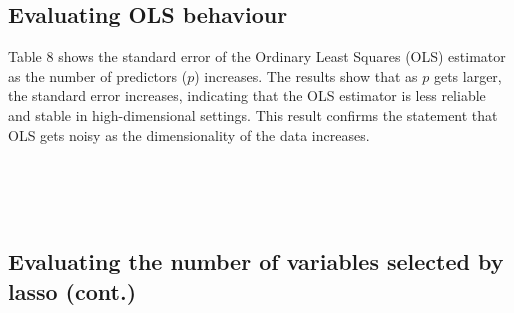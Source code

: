 \subsection{Evaluating OLS behaviour}
Table 8 shows the standard error of the Ordinary Least Squares (OLS) estimator as the number of predictors ($p$) increases. The results show that as $p$ gets larger, the standard error increases, indicating that the OLS estimator is less reliable and stable in high-dimensional settings. This result confirms the statement that OLS gets noisy as the dimensionality of the data increases.
\begin{table}[h!]
\renewcommand{\arraystretch}{1.5}
\centering
\small
{}
\caption{\textit{Standard Errors of the OLS Estimator for the Lalonde Dataset across a different number of predictors.}}
\label{table:1}
\end{table}
\\
\\
\\
\subsection{Evaluating the number of variables selected by lasso (cont.)}

